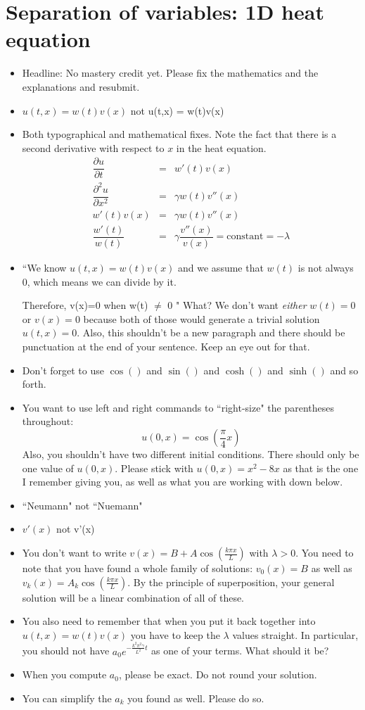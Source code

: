 \documentclass{article}
\def\ds{\displaystyle}
\newcommand{\bea}{\begin{eqnarray*}}
\newcommand{\eea}{\end{eqnarray*}}
\begin{document}
\section{Separation of variables: 1D heat equation}
\begin{itemize}
\item Headline: No mastery credit yet. Please fix the mathematics and the explanations and resubmit. 
\item $u(t,x) = w(t)v(x)$ not u(t,x) = w(t)v(x)
\item Both typographical and mathematical fixes. Note the fact that there is a second derivative with respect to $x$ in the heat equation. \bea
\dfrac{\partial u}{\partial t} &=& w'(t)v(x) \\
\dfrac{\partial^2 u}{\partial x^2} &=& \gamma w(t)v''(x) \\
w'(t)v(x) &=& \gamma w(t)v''(x) \\
\dfrac{w'(t)}{w(t)} &=& \gamma \dfrac{v''(x)}{v(x)} = \mbox{constant} = -\lambda
\eea
\item ``We know $u(t,x) = w(t)v(x)$ and we assume that $w(t)$ is not always 0, which means we can divide by it.

Therefore, v(x)=0 when w(t) $\neq$ 0 " What? We don't want \emph{either} $w(t)=0$ or $v(x)=0$ because both of those would generate a trivial solution $u(t,x)=0$. Also, this shouldn't be a new paragraph and there should be punctuation at the end of your sentence. Keep an eye out for that. 
\item  Don't forget to use $\cos()$ and $\sin()$ and $\cosh()$ and $\sinh()$ and so forth. 
\item You want to use left and right commands to ``right-size" the parentheses throughout: 
\[u(0,x) = \cos\left(\frac{\pi}{4}x\right) \] Also, you shouldn't have two different initial conditions. There should only be one value of $u(0,x)$. Please stick with $\ds u(0,x) = x^2-8x$ as that is the one I remember giving you, as well as what you are working with down below. 
\item ``Neumann" not ``Nuemann"
\item $v'(x)$ not v'(x)
\item You don't want to write $\ds v(x) = B+A\cos\left(\frac{k\pi x}{L}\right)$ with $\lambda>0$. You need to note that you have found a whole family of solutions: $v_0(x) = B$ as well as $\ds v_k(x) = A_k\cos\left(\frac{k\pi x}{L}\right)$. By the principle of superposition, your general solution will be a linear combination of all of these. 
\item You also need to remember that when you put it back together into $u(t,x) = w(t)v(x)$ you have to keep the $\lambda$ values straight. In particular, you should not have $\ds a_0e^{-\frac{k^2\pi^2\gamma}{L^2}t}$ as one of your terms. What should it be?
\item When you compute $\ds a_0$, please be exact. Do not round your solution. 
\item You can simplify the $\ds a_k$ you found as well. Please do so. 
\end{itemize}
\end{document}
